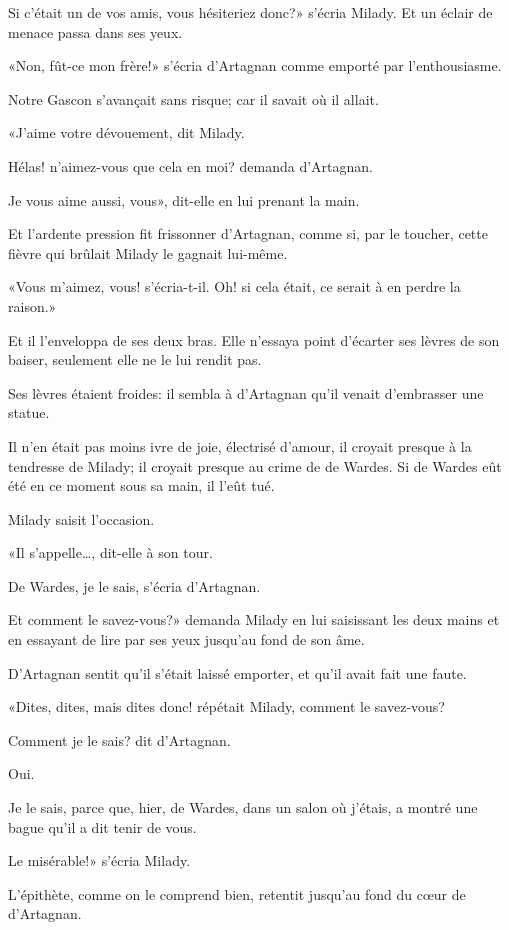 \speak  Si c'était un de vos amis, vous hésiteriez donc?» s'écria Milady. Et un éclair de menace passa dans ses yeux. 

«Non, fût-ce mon frère!» s'écria d'Artagnan comme emporté par l'enthousiasme. 

Notre Gascon s'avançait sans risque; car il savait où il allait. 

«J'aime votre dévouement, dit Milady. 

\speak  Hélas! n'aimez-vous que cela en moi? demanda d'Artagnan. 

\speak  Je vous aime aussi, vous», dit-elle en lui prenant la main. 

Et l'ardente pression fit frissonner d'Artagnan, comme si, par le toucher, cette fièvre qui brûlait Milady le gagnait lui-même. 

«Vous m'aimez, vous! s'écria-t-il. Oh! si cela était, ce serait à en perdre la raison.» 

Et il l'enveloppa de ses deux bras. Elle n'essaya point d'écarter ses lèvres de son baiser, seulement elle ne le lui rendit pas. 

Ses lèvres étaient froides: il sembla à d'Artagnan qu'il venait d'embrasser une statue. 

Il n'en était pas moins ivre de joie, électrisé d'amour, il croyait presque à la tendresse de Milady; il croyait presque au crime de de Wardes. Si de Wardes eût été en ce moment sous sa main, il l'eût tué. 

Milady saisit l'occasion. 

«Il s'appelle\dots, dit-elle à son tour. 

\speak  De Wardes, je le sais, s'écria d'Artagnan. 

\speak  Et comment le savez-vous?» demanda Milady en lui saisissant les deux mains et en essayant de lire par ses yeux jusqu'au fond de son âme. 

D'Artagnan sentit qu'il s'était laissé emporter, et qu'il avait fait une faute. 

«Dites, dites, mais dites donc! répétait Milady, comment le savez-vous? 

\speak  Comment je le sais? dit d'Artagnan. 

\speak  Oui. 

\speak  Je le sais, parce que, hier, de Wardes, dans un salon où j'étais, a montré une bague qu'il a dit tenir de vous. 

\speak  Le misérable!» s'écria Milady. 

L'épithète, comme on le comprend bien, retentit jusqu'au fond du cœur de d'Artagnan. 

